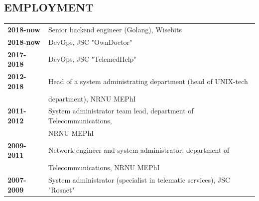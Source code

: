 \begin{resume}
\section{EMPLOYMENT}
\vspace{0.1in} 
\begin{tabular}{ll}
    {\bf 2018-now}  & Senior backend engineer (Golang), Wisebits\\
    {\bf 2018-now}  & DevOps, JSC "OwnDoctor"\\
    {\bf 2017-2018} & DevOps, JSC "TelemedHelp"\\
    {\bf 2012-2018} & Head of a system administrating department (head of UNIX-tech\\
                    & department), NRNU MEPhI\\
    {\bf 2011-2012} & System administrator team lead, department of Telecommunications,\\
                    & NRNU MEPhI\\
    {\bf 2009-2011} & Network engineer and system administrator, department of \\
                    & Telecommunications, NRNU MEPhI\\
    {\bf 2007-2009} & System administrator (specialist in telematic services), JSC "Rosnet"\\
\end{tabular}


\end{resume}
